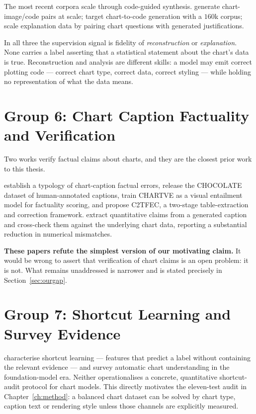 The most recent corpora scale through code-guided synthesis. \citet{chartgen}
generate chart-image/code pairs at scale; \citet{chartcoder} target chart-to-code
generation with a $160$k corpus; \citet{chartqax} scale explanation data by
pairing chart questions with generated justifications.

In all three the supervision signal is fidelity of \emph{reconstruction} or
\emph{explanation}. None carries a label asserting that a statistical statement
about the chart's data is true. Reconstruction and analysis are different skills:
a model may emit correct plotting code --- correct chart type, correct data,
correct styling --- while holding no representation of what the data means.

\section{Group 6: Chart Caption Factuality and Verification}
\label{sec:closest}

Two works verify factual claims about charts, and they are the closest prior work
to this thesis.

\citet{chocolate} establish a typology of chart-caption factual errors, release
the CHOCOLATE dataset of human-annotated captions, train CHARTVE as a visual
entailment model for factuality scoring, and propose C2TFEC, a two-stage
table-extraction and correction framework. \citet{techrxiv} extract quantitative
claims from a generated caption and cross-check them against the underlying chart
data, reporting a substantial reduction in numerical mismatches.

\textbf{These papers refute the simplest version of our motivating claim.} It
would be wrong to assert that verification of chart claims is an open problem: it
is not. What remains unaddressed is narrower and is stated precisely in
Section~\ref{sec:ourgap}.

\section{Group 7: Shortcut Learning and Survey Evidence}

\citet{shortcut} characterise shortcut learning --- features that predict a label
without containing the relevant evidence --- and \citet{survey} survey automatic
chart understanding in the foundation-model era. Neither operationalises a
concrete, quantitative shortcut-audit protocol for chart models. This directly
motivates the eleven-test audit in Chapter~\ref{ch:method}: a balanced chart
dataset can be solved by chart type, caption text or rendering style unless those
channels are explicitly measured.


